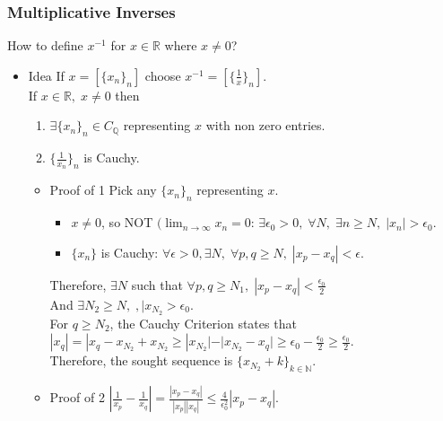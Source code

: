 \documentclass[11pt]{article}
\newcommand{\0}{\emptyset}
\newcommand{\N}{\mathbb{N}}
\newcommand{\Q}{\mathbb{Q}}
\newcommand{\R}{\mathbb{R}}
\begin{document}
\subsubsection*{Multiplicative Inverses}
\label{sec:org27547bc}
How to define \(x^{-1}\) for \(x\in\R\) where \(x\neq 0\)?\\[0pt]
\begin{itemize}
\item Idea
\label{sec:orgef6ba9f}
If \(x=[\{x_{n}\}_{n}]\) choose \(x^{-1}=[\{\frac{1}{x} \}_{n}]\).\\[0pt]
If \(x\in\R,\;x\neq0\) then\\[0pt]
\begin{enumerate}
\item \(\exists \{x_{n}\}_{n}\in C_{\Q}\) representing \(x\) with non zero entries.\\[0pt]
\item \(\{\frac{1}{x_{n}}\}_{n}\) is Cauchy.\\[0pt]
\end{enumerate}
\begin{itemize}
\item Proof of 1
\label{sec:org8d07de7}
Pick any \(\{x_{n}\}_{n}\) representing \(x\).\\[0pt]
\begin{itemize}
\item \(x\neq 0\), so NOT \((\lim_{n\to\infty}x_{n}=0\): \(\exists \epsilon_{0}>0,\;\forall N,\;\exists n\geq N,\;|x_{n}|>\epsilon_{0}\).\\[0pt]
\item \(\{x_{n}\}\) is Cauchy: \(\forall\epsilon>0,\exists N,\;\forall p,q\geq N,\;|x_{p}-x_{q}|<\epsilon\).\\[0pt]
\end{itemize}
Therefore, \(\exists N\) such that \(\forall p,q\geq N_{1},\;|x_{p}-x_{q}|<\frac{\epsilon_{0}}{2}\)\\[0pt]
And \(\exists N_{2}\geq N,\;,|x_{N_{2}}>\epsilon_{0}\).\\[0pt]
For \(q\geq N_{2}\), the Cauchy Criterion states that \(|x_{q}|=|x_{q}-x_{N_{2}}+x_{N_{2}}\geq|x_{N_{2}}|-|x_{N_{2}}-x_{q}|\geq \epsilon_{0}-\frac{\epsilon_{0}}{2}\geq\frac{\epsilon_{0}}{2}\).\\[0pt]
Therefore, the sought sequence is \(\{x_{N_{2}}+k\}_{k\in\N}\).\\[0pt]
\item Proof of 2
\label{sec:org7344825}
\(\left| \frac{1}{x_{p}} -\frac{1}{x_{q}} \right| =\frac{|x_{p}-x_{q}|}{|x_{p}||x_{q}|}\leq\frac{4}{\epsilon_{0}^{2}} |x_{p}-x_{q}|\).\\[0pt]
\end{itemize}
\end{itemize}
\end{document}
